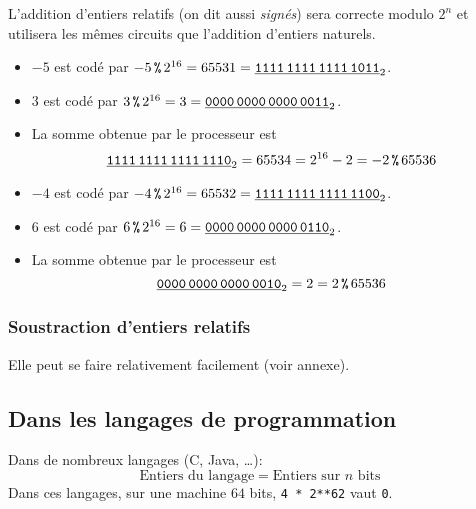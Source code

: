 \begin{rem}
  L'addition d'entiers relatifs (on dit aussi \emph{signés}) sera correcte modulo $2^{n}$ et utilisera les mêmes circuits que l'addition d'entiers naturels.
\end{rem}
\begin{exemple}
\begin{itemize}
\item[\textbullet] $-5$ est codé par $-5 \operatorname{\texttt{\%}} 2^{16} = 65531 =
  \underline{\text{\texttt{1111\,1111\,1111\,1011}}}_{2}$.
\item[\textbullet] $3$ est codé par $3 \operatorname{\texttt{\%}} 2^{16} = 3 =
  \underline{\text{\texttt{0000\,0000\,0000\,0011}}}_{2}$.
\item[\textbullet] La somme obtenue par le processeur est
  \begin{equation*}
    \underline{\text{\texttt{1111\,1111\,1111\,1110}}}_{2} = 65534 = 2^{16}-2 = -2 \operatorname{\texttt{\%}} 65536
  \end{equation*}
\end{itemize}
\end{exemple}
\begin{exemple}
\begin{itemize}
\item[\textbullet] $-4$ est codé par $-4 \operatorname{\texttt{\%}} 2^{16} = 65532 =
  \underline{\text{\texttt{1111\,1111\,1111\,1100}}}_{2}$.
\item[\textbullet] $6$ est codé par $6 \operatorname{\texttt{\%}} 2^{16} = 6 =
  \underline{\text{\texttt{0000\,0000\,0000\,0110}}}_{2}$.
\item[\textbullet] La somme obtenue par le processeur est
  \begin{equation*}
   \underline{\text{\texttt{0000\,0000\,0000\,0010}}}_{2} = 2 = 2 \operatorname{\texttt{\%}} 65536
  \end{equation*}
\end{itemize}
\end{exemple}

\subsubsection{Soustraction d'entiers relatifs}

Elle peut se faire relativement facilement (voir annexe).



\subsection{Dans les langages de programmation}

Dans de nombreux langages (C, Java, \ldots):
\begin{equation*}
  \text{Entiers du langage} = \text{Entiers sur $n$ bits}
\end{equation*}
Dans ces langages, sur une machine $64$ bits,
\texttt{4 * 2**62} vaut \texttt{0}.

